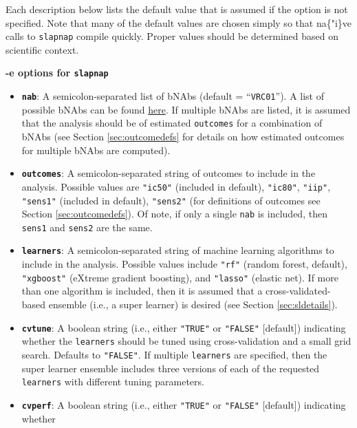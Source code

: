 \documentclass[]{article}
\providecommand{\tightlist}{%
  \setlength{\itemsep}{0pt}\setlength{\parskip}{0pt}}
\begin{document}
Each description below lists the default value that is assumed if the
option is not specified. Note that many of the default values are chosen
simply so that na\{"i\}ve calls to \texttt{slapnap} compile quickly.
Proper values should be determined based on scientific context.

\textbf{-e options for \texttt{slapnap}}

\begin{itemize}
\tightlist
\item
  \textbf{\texttt{nab}}: A semicolon-separated list of bNAbs (default =
  ``\texttt{VRC01}''). A list of possible bNAbs can be found
  \href{https://www.hiv.lanl.gov/components/sequence/HIV/neutralization/main.comp}{here}.
  If multiple bNAbs are listed, it is assumed that the analysis should
  be of estimated \texttt{outcomes} for a combination of bNAbs (see
  Section \ref{sec:outcomedefs} for details on how estimated outcomes
  for multiple bNAbs are computed).
\item
  \textbf{\texttt{outcomes}}: A semicolon-separated string of outcomes
  to include in the analysis. Possible values are \texttt{"ic50"}
  (included in default), \texttt{"ic80"}, \texttt{"iip"},
  \texttt{"sens1"} (included in default), \texttt{"sens2"} (for
  definitions of outcomes see Section \ref{sec:outcomedefs}). Of note,
  if only a single \texttt{nab} is included, then \texttt{sens1} and
  \texttt{sens2} are the same.
\item
  \textbf{\texttt{learners}}: A semicolon-separated string of machine
  learning algorithms to include in the analysis. Possible values
  include \texttt{"rf"} (random forest, default), \texttt{"xgboost"}
  (eXtreme gradient boosting), and \texttt{"lasso"} (elastic net). If
  more than one algorithm is included, then it is assumed that a
  cross-validated-based ensemble (i.e., a super learner) is desired (see
  Section \ref{sec:sldetails}).
\item
  \textbf{\texttt{cvtune}}: A boolean string (i.e., either
  \texttt{"TRUE"} or \texttt{"FALSE"} {[}default{]}) indicating whether
  the \texttt{learners} should be tuned using cross-validation and a
  small grid search. Defaults to \texttt{"FALSE"}. If multiple
  \texttt{learners} are specified, then the super learner ensemble
  includes three versions of each of the requested \texttt{learners}
  with different tuning parameters.
\item
  \textbf{\texttt{cvperf}}: A boolean string (i.e., either
  \texttt{"TRUE"} or \texttt{"FALSE"} {[}default{]}) indicating whether

\end{itemize}
\end{document}
